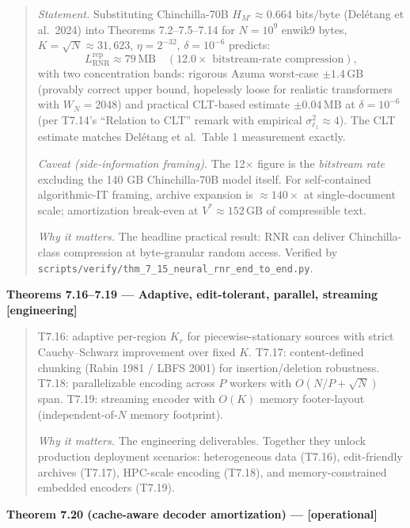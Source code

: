 \documentclass[
]{article}
\begin{document}
\begin{quote}
\emph{Statement.} Substituting Chinchilla-70B $H_{M'} \approx 0.664$
bits/byte (Delétang et al.\ 2024) into Theorems 7.2--7.5--7.14 for
$N = 10^9$ enwik9 bytes, $K = \sqrt{N} \approx 31{,}623$,
$\eta = 2^{-32}$, $\delta = 10^{-6}$ predicts:
\[
L^{\mathrm{rep}}_{\mathrm{RNR}} \approx 79\,\mathrm{MB}
\quad (\text{12.0$\times$ bitstream-rate compression}),
\]
with two concentration bands: rigorous Azuma worst-case
$\pm 1.4\,\mathrm{GB}$ (provably correct upper bound, hopelessly
loose for realistic transformers with $W_N = 2048$) and practical
CLT-based estimate $\pm 0.04\,\mathrm{MB}$ at $\delta = 10^{-6}$ (per
T7.14's ``Relation to CLT'' remark with empirical $\sigma^2_{\ell_1}
\approx 4$). The CLT estimate matches Delétang et al.\ Table 1
measurement exactly.

\emph{Caveat (side-information framing).} The 12$\times$ figure is the
\emph{bitstream rate} excluding the 140 GB Chinchilla-70B model itself.
For self-contained algorithmic-IT framing, archive expansion is
$\approx 140\times$ at single-document scale; amortization break-even
at $V^\ast \approx 152\,\mathrm{GB}$ of compressible text.

\emph{Why it matters.} The headline practical result: RNR can deliver
Chinchilla-class compression at byte-granular random access.
Verified by \texttt{scripts/verify/thm\_7\_15\_neural\_rnr\_end\_to\_end.py}.
\end{quote}

\textbf{Theorems 7.16--7.19 --- Adaptive, edit-tolerant, parallel,
streaming {[}engineering{]}}

\begin{quote}
T7.16: adaptive per-region $K_r$ for piecewise-stationary sources with
strict Cauchy--Schwarz improvement over fixed $K$. T7.17: content-defined
chunking (Rabin 1981 / LBFS 2001) for insertion/deletion robustness.
T7.18: parallelizable encoding across $P$ workers with $O(N/P + \sqrt{N})$
span. T7.19: streaming encoder with $O(K)$ memory footer-layout
(independent-of-$N$ memory footprint).

\emph{Why it matters.} The engineering deliverables. Together they
unlock production deployment scenarios: heterogeneous data (T7.16),
edit-friendly archives (T7.17), HPC-scale encoding (T7.18), and
memory-constrained embedded encoders (T7.19).
\end{quote}

\textbf{Theorem 7.20 (cache-aware decoder amortization) ---
{[}operational{]}}
\end{document}
